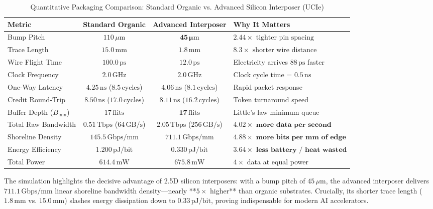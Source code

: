 \begin{table}[htbp]
\centering
\caption{Quantitative Packaging Comparison: Standard Organic vs. Advanced Silicon Interposer (UCIe)}
\label{tab:chiplet-pkg-eval}
\begin{tabular}{lccl}
\hline
\textbf{Metric} & \textbf{Standard Organic} & \textbf{Advanced Interposer} & \textbf{Why It Matters} \\
\hline
Bump Pitch & $110\,\mu\mathrm{m}$ & $\mathbf{45\,\mu\mathrm{m}}$ & $2.44\times\text{ tighter pin spacing}$ \\
Trace Length & $15.0\,\mathrm{mm}$ & $\mathbf{1.8\,\mathrm{mm}}$ & $8.3\times\text{ shorter wire distance}$ \\
Wire Flight Time & $100.0\,\mathrm{ps}$ & $\mathbf{12.0\,\mathrm{ps}}$ & Electricity arrives $88\,\mathrm{ps}$ faster \\
Clock Frequency & $2.0\,\mathrm{GHz}$ & $\mathbf{2.0\,\mathrm{GHz}}$ & Clock cycle time = $0.5\,\mathrm{ns}$ \\
One-Way Latency & $4.25\,\mathrm{ns}$ ($8.5\,\mathrm{cycles}$) & $\mathbf{4.06\,\mathrm{ns}}$ ($8.1\,\mathrm{cycles}$) & Rapid packet response \\
Credit Round-Trip & $8.50\,\mathrm{ns}$ ($17.0\,\mathrm{cycles}$) & $\mathbf{8.11\,\mathrm{ns}}$ ($16.2\,\mathrm{cycles}$) & Token turnaround speed \\
Buffer Depth ($B_{\mathrm{min}}$) & $17\,\mathrm{flits}$ & $\mathbf{17\,\mathrm{flits}}$ & Little's law minimum queue \\
Total Raw Bandwidth & $0.51\,\mathrm{Tbps}$ ($64\,\mathrm{GB/s}$) & $\mathbf{2.05\,\mathrm{Tbps}}$ ($256\,\mathrm{GB/s}$) & $\mathbf{4.02\times\text{ more data per second}}$ \\
Shoreline Density & $145.5\,\mathrm{Gbps/mm}$ & $\mathbf{711.1\,\mathrm{Gbps/mm}}$ & $\mathbf{4.88\times\text{ more bits per mm of edge}}$ \\
Energy Efficiency & $1.200\,\mathrm{pJ/bit}$ & $\mathbf{0.330\,\mathrm{pJ/bit}}$ & $\mathbf{3.64\times\text{ less battery / heat wasted}}$ \\
Total Power & $614.4\,\mathrm{mW}$ & $\mathbf{675.8\,\mathrm{mW}}$ & $4\times$ data at equal power \\
\hline
\end{tabular}
\end{table}

The simulation highlights the decisive advantage of 2.5D silicon interposers: with a bump pitch of $45\,\mu\mathrm{m}$, the advanced interposer delivers $711.1\,\mathrm{Gbps/mm}$ linear shoreline bandwidth density—nearly **$5\times$ higher** than organic substrates. Crucially, its shorter trace length ($1.8\,\mathrm{mm}$ vs. $15.0\,\mathrm{mm}$) slashes energy dissipation down to $0.33\,\mathrm{pJ/bit}$, proving indispensable for modern AI accelerators.

